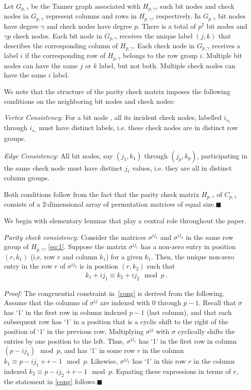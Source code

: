 Let $G_{p,\gamma}$ be the Tanner graph associated with
$H_{p,\gamma}$, such bit nodes and check nodes in $G_{p,\gamma}$
represent columns and rows in $H_{p,\gamma}$, respectively. In
$G_{p,\gamma}$ bit nodes have degree $\gamma$ and check nodes have
degree $p$. There is a total of $p^2$ bit nodes and $\gamma p$ check
nodes. Each bit node in $G_{p,\gamma}$ receives the unique label
$(j,k)$ that describes the corresponding column of $H_{p,\gamma}$.
Each check node in $G_{p,\gamma}$ receives a label $i$ if
 the corresponding row of $H_{p,\gamma}$ belongs to the row group
$i$. Multiple bit nodes can have the same $j$ or $k$ label, but not
both. Multiple check nodes can have the same $i$ label.

We note that the structure of the parity check matrix imposes the
following conditions on the neighboring bit nodes and check nodes:

\textit{Vertex Consistency:} For a bit node , all its incident check
nodes, labelled $i_{s_1}$ through $i_{s_\gamma}$ must have distinct
labels, i.e. these check nodes are in distinct row groups.

\textit{Edge Consistency:} All bit nodes, say $(j_{1},k_{1})$
through $(j_{p},k_{p})$, participating in the same check node must
have distinct $j_\ell$ values, i.e. they are all in distinct
column groups.

Both conditions follow from the fact that the parity check matrix
$H_{p,\gamma}$ of $C_{p,\gamma}$ consists of a 2-dimensional array
of permutation matrices of equal size.\hfill$\blacksquare$

We begin with elementary lemmas that play a central role throughout
the paper.

\begin{lemma}\textit{Parity check consistency:} Consider the matrices
$\sigma^{ij_1}$ and $\sigma^{ij_2}$ in the same row group of
$H_{p,\gamma}$, \eqref{eq:1}. Suppose the matrix $\sigma^{ij_1}$ has
a non-zero entry in position $(r,k_1)$ (i.e. row $r$ and column
$k_1$) for a given $k_1$. Then, the unique non-zero entry in the row
$r$ of $\sigma^{ij_2}$ is in position $(r,k_2)$ such that
\begin{eqnarray}\label{cong}
k_1+ij_1 \equiv k_2+ij_2 \mod p~.
\end{eqnarray}\end{lemma}

\noindent \textit{Proof:} The congruential constraint
in~\eqref{cong} is derived from the following. Assume that the
columns of $\sigma^{ij}$ are indexed with $0$ through $p-1$. Recall
that $\sigma$ has `1' in the first row in column indexed $p-1$ (last
column), and that each subsequent row has `1' in a position that is
a cyclic shift to the right of the position of `1' in the previous
row. Multiplying $\sigma^{ij}$ with $\sigma$ cyclically shifts the
entries by one position to the left. Thus, $\sigma^{ij_1}$ has `1'
in the first row in column $(p-ij_1) \mod p$, and has `1' in some
row $r$ in the column $k_1 \equiv p-ij_1+r-1 \mod p$.  Likewise,
$\sigma^{ij_2}$ has `1' in this row $r$ in the column indexed $k_2
\equiv p-ij_2+r-1 \mod p$. Equating these expressions in terms of
$r$, the statement in \eqref{cong} follows.\hfill$\blacksquare$

